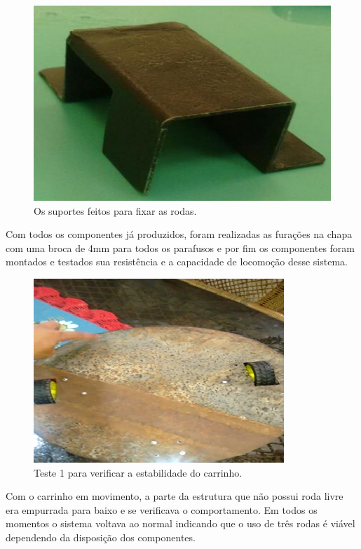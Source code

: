 \begin{figure}[H]
	\centering
	\includegraphics[scale=0.3]{figuras/suporte_fixar_rodas.png}
	\caption{Os suportes feitos para fixar as rodas.}
	\label{img:suporte_fixar_rodas}
\end{figure}

Com todos os componentes já produzidos, foram realizadas as furações na chapa com uma broca de 4mm para todos os parafusos e por fim os componentes foram montados e testados sua resistência e a capacidade de locomoção desse sistema. 

\begin{figure}[H]
	\centering
	\includegraphics[scale=0.3]{figuras/base_teste.png}
	\caption{Teste 1 para verificar a estabilidade do carrinho.}
	\label{img:base_teste}
\end{figure}

Com o carrinho em movimento, a parte da estrutura que não possui roda livre era empurrada para baixo e se verificava o comportamento. Em todos os momentos o sistema voltava ao normal indicando que o uso de três rodas é viável dependendo da disposição dos componentes.

